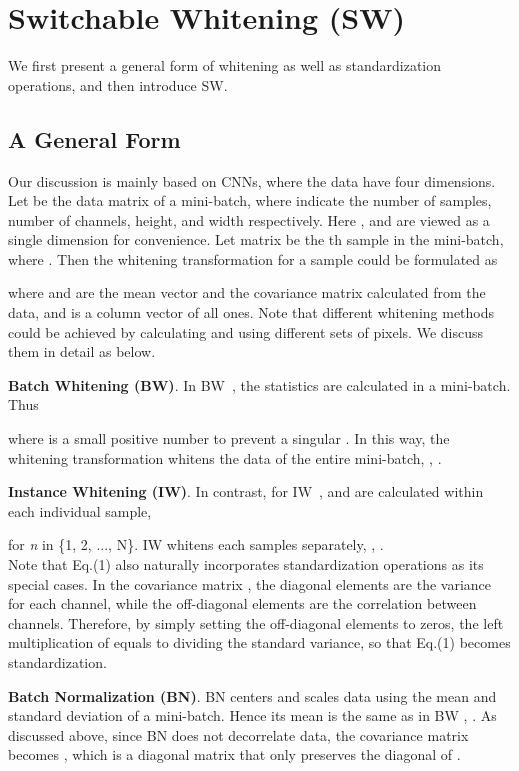 \documentclass[10pt,twocolumn,letterpaper]{article}
\begin{document}
%
 	\section{Switchable Whitening (SW)}

We first present a general form of whitening as well as standardization operations, and then introduce SW.

\subsection{A General Form}

Our discussion is mainly based on CNNs, where the data have four dimensions.
Let  be the data matrix of a mini-batch, where  indicate the number of samples, number of channels, height, and width respectively.
Here ,  and  are viewed as a single dimension for convenience.
Let matrix  be the th sample in the mini-batch, where .
Then the whitening transformation  for a sample  could be formulated as

where  and  are the mean vector and the covariance matrix calculated from the data, and  is a column vector of all ones.
Note that different whitening methods could be achieved by calculating  and  using different sets of pixels.
We discuss them in detail as below.


\textbf{Batch Whitening (BW)}.
In BW~\cite{lei2018decorrelated}, the statistics are calculated in a mini-batch.
Thus 

where  is a small positive number to prevent a singular .
In this way, the whitening transformation  whitens the data of the entire mini-batch, \ie, .


\textbf{Instance Whitening (IW)}.
In contrast, for IW~\cite{li2017universal},  and  are calculated within each individual sample,

for \textit{n} in \{1, 2, ..., N\}.
IW whitens each samples separately, \ie, . 
~\\

Note that Eq.(1) also naturally incorporates standardization operations as its special cases.
In the covariance matrix , the diagonal elements are the variance for each channel, while the off-diagonal elements are the correlation between channels.
Therefore, by simply setting the off-diagonal elements to zeros, the left multiplication of  equals to dividing the standard variance, so that Eq.(1) becomes standardization.

\textbf{Batch Normalization (BN)}.
BN\cite{ioffe2015batch} centers and scales data using the mean and standard deviation of a mini-batch.
Hence its mean is the same as in BW \ie, .
As discussed above, since BN does not decorrelate data, the covariance matrix becomes , which is a diagonal matrix that only preserves the diagonal of .
\end{document}
